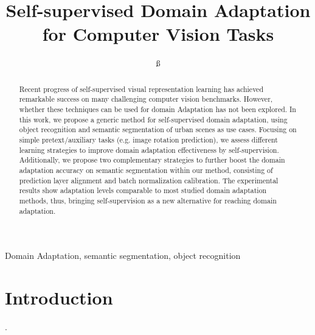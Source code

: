 \documentclass[conference]{IEEEtran}
\begin{document}
\title{Self-supervised Domain Adaptation for Computer Vision Tasks}

\author{
ß
}

\maketitle

\begin{abstract}
Recent progress of self-supervised visual representation learning
has achieved remarkable success on many challenging computer vision
benchmarks. 
However, whether these techniques can be used for domain Adaptation
has not been explored. 
In this work, we propose a generic method for self-supervised domain adaptation,
using object recognition and semantic segmentation of urban scenes as use cases.
Focusing on simple pretext/auxiliary tasks (e.g. image rotation prediction),
we assess different learning strategies to improve domain adaptation effectiveness 
by self-supervision. 
Additionally, we propose two complementary strategies to further boost 
the domain adaptation accuracy on semantic segmentation within our method,
consisting of prediction layer alignment and batch normalization calibration.
The experimental results show adaptation levels comparable to most studied domain
adaptation methods, thus, bringing self-supervision as a new alternative for 
reaching domain adaptation. 
\end{abstract}

\begin{IEEEkeywords}
Domain Adaptation, semantic segmentation, object recognition
\end{IEEEkeywords}

\section{Introduction}
\cite{b1}.



\end{document}

